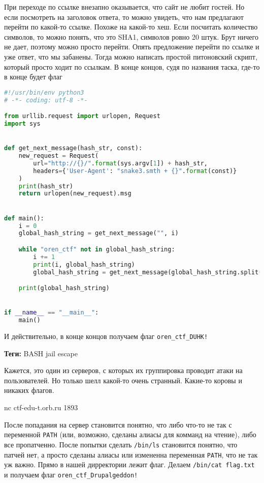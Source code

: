 \documentclass[idxtotoc,hyperref,openany,oneside]{files/admin} %
\begin{document}
При переходе по ссылке внезапно оказывается, что сайт не любит гостей. Но если посмотреть на заголовок ответа, то можно увидеть, что нам предлагают перейти по какой-то ссылке. Похоже на какой-то хеш. Если посчитать количество символов, то можно понять, что это SHA1, символов ровно 20 штук. Брут ничего не дает, поэтому можно просто перейти. Опять предложение перейти по ссылке и уже ответ, что мы забанены. Тогда можно написать простой питоновский скрипт, который просто ходит по ссылкам. В конце концов, судя по названия таска, где-то в конце будет флаг
\begin{lstlisting}[language=Python]
#!/usr/bin/env python3
# -*- coding: utf-8 -*-

from urllib.request import urlopen, Request
import sys


def get_next_message(hash_str, const):
    new_request = Request(
        url="http://{}/".format(sys.argv[1]) + hash_str,
        headers={'User-Agent': "snake3.smth + {}".format(const)}
    )
    print(hash_str)
    return urlopen(new_request).msg


def main():
    i = 0
    global_hash_string = get_next_message("", i)

    while "oren_ctf" not in global_hash_string:
        i += 1
        print(i, global_hash_string)
        global_hash_string = get_next_message(global_hash_string.split()[-1], i)

    print(global_hash_string)


if __name__ == "__main__":
    main()
\end{lstlisting}

И действительно, в конце концов получаем флаг \verb|oren_ctf_DUHK!|



\textbf{Теги:} BASH jail escape\vspace{\baselineskip}

\begin{tcolorbox}
Кажется, это один из серверов, с которых их группировка проводит атаки на пользователей. Но только шелл какой-то очень странный. Какие-то коровы и никаких флагов.

nc ctf-edu-t.orb.ru 1893
\end{tcolorbox}

После попадания на сервер становится понятно, что либо что-то не так с переменной \verb|PATH| (или, возможно, сделаны алиасы для комманд на чтение), либо все пропатченно. После попытки сделать \verb|/bin/ls| становится понятно, что патчей нет, а просто сделаны алиасы или измененна переменная \verb|PATH|, что не так уж важно. Прямо в нашей дирректории лежит флаг. Делаем \verb|/bin/cat flag.txt| и получаем флаг \verb|oren_ctf_Drupalgeddon!|
\end{document}
